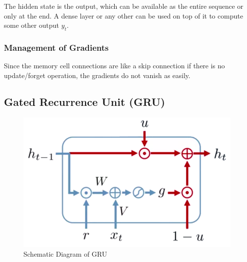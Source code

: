 The hidden state is the output, which can be available as the entire sequence or only at the end. A dense layer or any other can be used on top of it to compute some other output $y_t$.

\subsubsection{Management of Gradients}

Since the memory cell connections are like a skip connection if there is no update/forget operation, the gradients do not vanish as easily.


\subsection{Gated Recurrence Unit (GRU)}

\begin{figure}[H]
	\centering
	\includegraphics[width=0.9\linewidth]{img/aml/gru-schematic.png}
	\caption{Schematic Diagram of GRU}
	\label{fig:gru-schmatic}
\end{figure}
